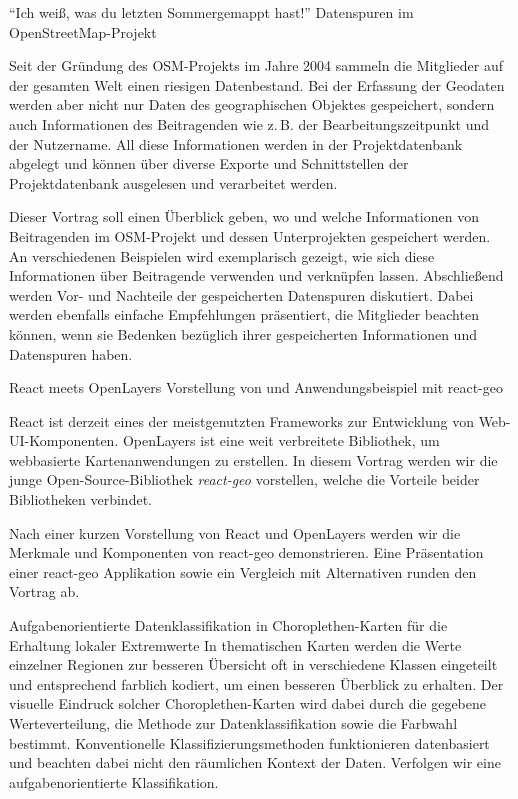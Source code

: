 %
{"`Ich weiß, was du letzten Sommer\linebreak gemappt hast!"'\vspace{0.2em}}%
{Datenspuren im OpenStreetMap-Projekt}%
{%
Seit der Gründung des OSM-Projekts im Jahre 2004 sammeln die Mitglieder auf
der gesamten Welt einen riesigen Datenbestand. Bei der Erfassung der Geodaten
werden aber nicht nur Daten des geographischen Objektes gespeichert, sondern
auch Informationen des Beitragenden wie z.\,B. der Bearbeitungszeitpunkt und
der Nutzername. All diese Informationen werden in der Projektdatenbank
abgelegt und können über diverse Exporte und Schnittstellen der
Projektdatenbank ausgelesen und verarbeitet werden.

Dieser Vortrag soll einen Überblick geben, wo und welche Informationen von
Beitragenden im OSM-Projekt und dessen Unterprojekten gespeichert werden. An
verschiedenen Beispielen wird exemplarisch gezeigt, wie sich diese
Informationen über Beitragende verwenden und verknüpfen lassen. Abschließend
werden Vor- und Nachteile der gespeicherten Datenspuren diskutiert. Dabei
werden ebenfalls einfache Empfehlungen präsentiert, die Mitglieder beachten
können, wenn sie Bedenken bezüglich ihrer gespeicherten Informationen und
Datenspuren haben.%
}

%
{React meets OpenLayers}%
{Vorstellung von und Anwendungsbeispiel mit react-geo}%
{%
React ist derzeit eines der meistgenutzten Frameworks zur Entwicklung von
Web-UI-Komponenten. OpenLayers ist eine weit verbreitete Bibliothek, um
webbasierte Kartenanwendungen zu erstellen. In diesem Vortrag werden wir die
junge Open-Source-Bibliothek \emph{react-geo} vorstellen, welche die Vorteile beider
Bibliotheken verbindet.

Nach einer kurzen Vorstellung von React und OpenLayers werden wir die Merkmale
und Komponenten von react-geo demonstrieren. Eine Präsentation einer react-geo
Applikation sowie ein Vergleich mit Alternativen runden den Vortrag ab.%
}

\vspace{-0.2em}
%
{Aufgabenorientierte Datenklassi\-fikation in Choroplethen-Karten für die Erhaltung lokaler Extremwerte}%
{}%
{%
In thematischen Karten werden die Werte einzelner Regionen zur besseren
Übersicht oft in verschiedene Klassen eingeteilt und entsprechend farblich
kodiert, um einen besseren Überblick zu erhalten. Der visuelle Eindruck solcher
Choroplethen-Karten wird dabei durch die gegebene Werteverteilung, die Methode
zur Datenklassifikation sowie die Farbwahl bestimmt. Konventionelle
Klassifizierungsmethoden funktionieren datenbasiert und beachten dabei nicht
den räumlichen Kontext der Daten. Verfolgen wir eine aufgabenorientierte
Klassifikation.%
}


